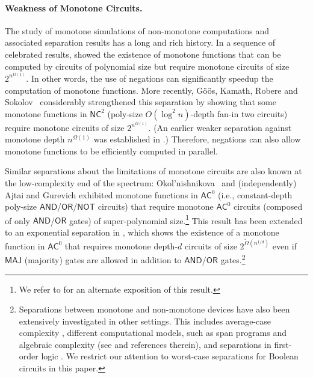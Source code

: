 \documentclass[11pt]{article}
\newcommand{\headsubsec}[1]{\paragraph{#1.}}
\begin{document}
\headsubsec{Weakness of Monotone Circuits} The study of monotone
simulations of non-monotone computations and associated separation results
has a long and rich history.  In a sequence of celebrated results,
\citep{razborov1985lower, andreev1985method,
DBLP:journals/combinatorica/AlonB87, tardos_1988} showed the existence of
monotone functions that can be computed by circuits of polynomial size but
require monotone circuits of size $2^{n^{\Omega(1)}}$. In other words, the
use of negations can significantly speedup the computation of monotone
functions.  More recently, 
G\"{o}\"{o}s, Kamath, Robere and Sokolov~\citep{gkrs19} 
considerably
strengthened this separation by showing that some monotone functions in
$\mathsf{NC}^2$ (poly-size $O(\log^2 n)$-depth fan-in two circuits) require
monotone circuits of size $2^{n^{\Omega(1)}}$. (An earlier weaker
separation against monotone depth $n^{\Omega(1)}$ was established in
\citep{RW92}.) Therefore, negations can also allow monotone functions to be
efficiently computed in parallel. 

Similar separations about the limitations of monotone circuits
are also known at the low-complexity end of the spectrum:   Okol'nishnikova~\cite{okolnishnikova_1982} and (independently) Ajtai and
Gurevich \citep{ajtai_gurevich_1987} exhibited monotone functions in $\mathsf{AC}^0$
(i.e., constant-depth poly-size
$\mathsf{AND}$/$\mathsf{OR}$/$\mathsf{NOT}$ circuits) that require monotone $\mathsf{AC}^0$
circuits (composed of only $\mathsf{AND}$/$\mathsf{OR}$ gates)
of super-polynomial size.\footnote{We refer to \cite{BST13} for an alternate exposition of this result.} This result has been extended to an exponential separation in \citep{cos15}, which shows the existence of a monotone function in $\mathsf{AC}^0$ that requires monotone depth-$d$ circuits of size $2^{\widetilde{\Omega}(n^{1/d})}$ even if $\mathsf{MAJ}$ (majority) gates are allowed in addition to $\mathsf{AND}$/$\mathsf{OR}$ gates.\footnote{Separations between monotone and non-monotone devices have also been extensively investigated in other settings. This includes average-case complexity \citep{DBLP:conf/icalp/BlaisHST14}, different computational models, such as span programs 
\citep{DBLP:journals/combinatorica/BabaiGW99, rprc16} and algebraic complexity (see \cite{cdm21} and references therein), and separations in first-order logic \citep{DBLP:conf/lics/Stolboushkin95, DBLP:conf/lics/Kuperberg21,  DBLP:journals/corr/abs-2201-11619}. We restrict our attention to worst-case separations for Boolean circuits in this paper.}
\end{document}
